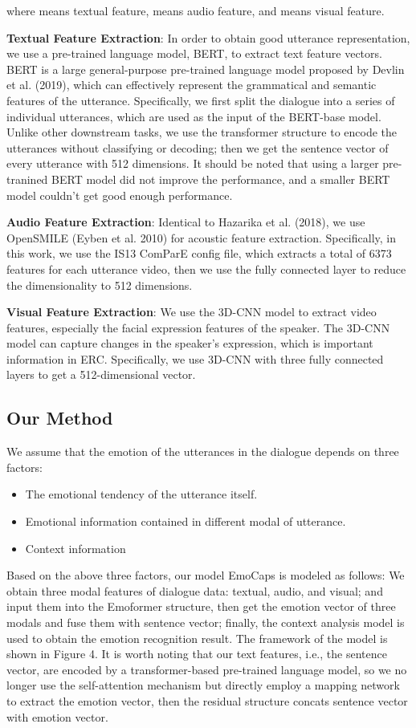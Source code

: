 \documentclass[11pt]{article}
\begin{document}
where  means textual feature,  means audio feature, and  means visual feature.

\noindent\textbf{Textual Feature Extraction}: In order to obtain good utterance representation, we use a pre-trained language model, BERT, to extract text feature vectors. BERT is a large general-purpose pre-trained language model proposed by Devlin et al. (2019), which can effectively represent the grammatical and semantic features of the utterance. Specifically, we first split the dialogue into a series of individual utterances, which are used as the input of the BERT-base model. Unlike other downstream tasks, we use the transformer structure to encode the utterances without classifying or decoding; then we get the sentence vector of every utterance with 512 dimensions. It should be noted that using a larger pre-tranined BERT model did not improve the performance, and a smaller BERT model couldn't get good enough performance.

\noindent\textbf{Audio Feature Extraction}: Identical to Hazarika et al. (2018), we use OpenSMILE (Eyben et al. 2010) for acoustic feature extraction. Specifically, in this work, we use the IS13 ComParE config file, which extracts a total of 6373 features for each utterance video, then we use the fully connected layer to reduce the dimensionality to 512 dimensions.

\noindent\textbf{Visual Feature Extraction}: We use the 3D-CNN model to extract video features, especially the facial expression features of the speaker. The 3D-CNN model can capture changes in the speaker's expression, which is important information in ERC. Specifically, we use 3D-CNN with three fully connected layers to get a 512-dimensional vector.

\subsection{Our Method} 
We assume that the emotion of the utterances in the dialogue depends on three factors:
\begin{itemize}
	\item The emotional tendency of the utterance itself.
	\item Emotional information contained in different modal of utterance.
	\item Context information
\end{itemize}
Based on the above three factors, our model EmoCaps is modeled as follows: We obtain three modal features of dialogue data: textual, audio, and visual; and input them into the Emoformer structure, then get the emotion vector of three modals and fuse them with sentence vector; finally, the context analysis model is used to obtain the emotion recognition result. The framework of the model is shown in Figure 4. It is worth noting that our text features, i.e., the sentence vector, are encoded by a transformer-based pre-trained language model, so we no longer use the self-attention mechanism but directly employ a mapping network to extract the emotion vector, then the residual structure concats sentence vector with emotion vector.
\end{document}
